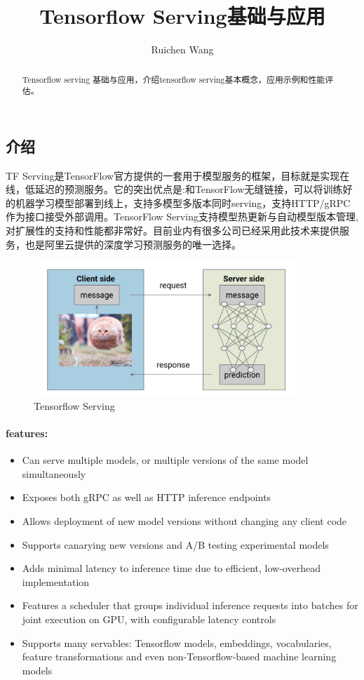 \documentclass[12pt,a4paper,oneside]{article}
\author{Ruichen Wang}
\title{Tensorflow Serving基础与应用}
\begin{document}
\begin{CJK*}{UTF8}{gbsn}

\maketitle
\begin{abstract}
Tensorflow serving 基础与应用，介绍tensorflow serving基本概念，应用示例和性能评估。
\end{abstract}

\section{介绍}
TF Serving是TensorFlow官方提供的一套用于模型服务的框架，目标就是实现在线，低延迟的预测服务。它的突出优点是:和TensorFlow无缝链接，可以将训练好的机器学习模型部署到线上，支持多模型多版本同时serving，支持HTTP/gRPC作为接口接受外部调用。TensorFlow Serving支持模型热更新与自动模型版本管理,对扩展性的支持和性能都非常好。目前业内有很多公司已经采用此技术来提供服务，也是阿里云提供的深度学习预测服务的唯一选择。


\begin{figure}[H]
\centering
\includegraphics[width=4in,height=2in]{tfserving}
\caption{Tensorflow Serving}
\end{figure}

\paragraph{features:}
\begin{itemize}
\item Can serve multiple models, or multiple versions of the same model simultaneously
\item Exposes both gRPC as well as HTTP inference endpoints
\item Allows deployment of new model versions without changing any client code
\item Supports canarying new versions and A/B testing experimental models
\item Adds minimal latency to inference time due to efficient, low-overhead implementation
\item Features a scheduler that groups individual inference requests into batches for joint execution on GPU, with configurable latency controls
\item  Supports many servables: Tensorflow models, embeddings, vocabularies, feature transformations and even non-Tensorflow-based machine learning models
\end{itemize}


\end{CJK*}
\end{document}
